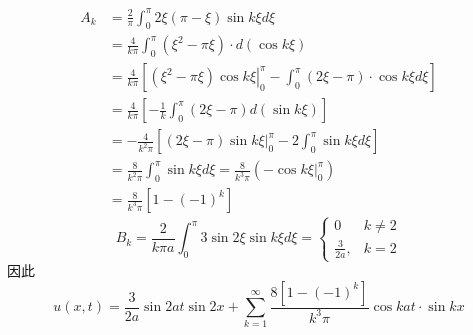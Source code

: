 \begin{questions}
\begin{solution}
$$
\begin{aligned}
A_{k} & =\frac{2}{\pi} \int_{0}^{\pi} 2 \xi(\pi-\xi) \sin k \xi d \xi \\
& =\frac{4}{k \pi} \int_{0}^{\pi}\left(\xi^{2}-\pi \xi\right) \cdot d(\cos k \xi) \\
& =\frac{4}{k \pi}\left[\left.\left(\xi^{2}-\pi \xi\right) \cos k \xi\right|_{0} ^{\pi}-\int_{0}^{\pi}(2 \xi-\pi) \cdot \cos k \xi d \xi\right] \\
& =\frac{4}{k \pi}\left[-\frac{1}{k} \int_{0}^{\pi}(2 \xi-\pi) d(\sin k \xi)\right] \\
& =-\frac{4}{k^{2} \pi}\left[\left.(2 \xi-\pi) \sin k \xi\right|_{0} ^{\pi}-2 \int_{0}^{\pi} \sin k \xi d \xi\right] \\
& =\frac{8}{k^{2} \pi} \int_{0}^{\pi} \sin k \xi d \xi=\frac{8}{k^{3} \pi}\left(-\left.\cos k \xi\right|_{0} ^{\pi}\right) \\
& =\frac{8}{k^{3} \pi}\left[1-(-1)^{k}\right]
\end{aligned}
$$
$$
B_{k}=\frac{2}{k \pi a} \int_{0}^{\pi} 3 \sin 2 \xi \sin k \xi d \xi=\left\{\begin{array}{ll}
0 & k \neq 2 \\
\frac{3}{2 a}, & k=2
\end{array}\right.
$$
因此
$$ u(x, t)=\frac{3}{2 a} \sin 2 a t \sin 2 x+\sum_{k=1}^{\infty} \frac{8\left[1-(-1)^{k}\right]}{k^{3} \pi} \cos k at\cdot\sin k x $$
    \end{solution}
\end{questions}




